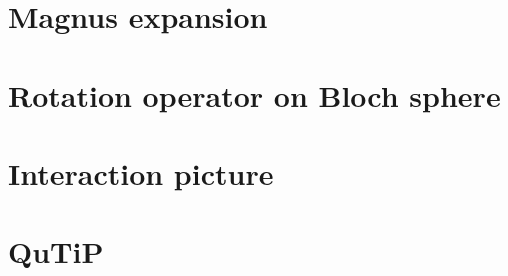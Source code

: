 \documentclass{article}
\begin{document}
\section{Magnus expansion}
\section{Rotation operator on Bloch sphere}
\section{Interaction picture}
\section{QuTiP}
\end{document}
